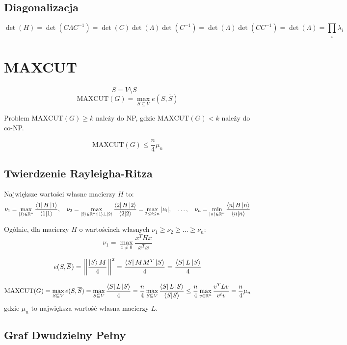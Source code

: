 \documentclass{../notatki}
\newcommand{\maxcut}{\textrm{MAXCUT}}
\begin{document}
\subsection{Diagonalizacja}

$$
\det(H) = \det(C \Lambda C^{-1}) = \det(C) \det(\Lambda) \det(C^{-1}) =
\det(\Lambda) \det(C C^{-1}) = \det(\Lambda) = \prod_i \lambda_i
$$

\section{MAXCUT}

$$
\overline{S} = V \setminus S \quad
$$
$$
\maxcut(G) = \max_{S \subseteq V} e(S, \overline{S})
$$

Problem $\maxcut(G) \geq k$ należy do NP, gdzie $\maxcut(G) < k$
należy do co-NP.

$$
\maxcut(G) \leq \frac{n}{4} \mu_n
$$

\subsection{Twierdzenie Rayleigha-Ritza}

Największe wartości własne macierzy $H$ to:
$$
\nu_1 = \max_{\ket{1} \in \mathbb{R}^n}
\frac{\bra{1}H\ket{1}}{\braket{1}{1}}, \quad \nu_2 = \max_{\ket{2} \in
\mathbb{R}^n : \ket{1} \perp \ket{2}}
\frac{\bra{2}H\ket{2}}{\braket{2}{2}} = \max_{2 \leq i \leq n}
|\nu_i|, \quad \dots, \quad \nu_n = \min_{\ket{n} \in \mathbb{R}^n}
\frac{\bra{n}H\ket{n}}{\braket{n}{n}}
$$

Ogólnie, dla macierzy $H$ o wartościach własnych $\nu_1 \geq \nu_2
\geq \dots \geq \nu_n$:
$$
\nu_1 = \max_{x \neq 0} \frac{x^THx}{x^Tx}
$$

\begin{examplebox}
  $$
  e(S, \overline{S}) = \left|\left|\frac{\ket{S} M}{4}\right|\right|^2 =
  \frac{\bra{S}MM^T\ket{S}}{4} =
  \frac{\bra{S}L\ket{S}}{4}
  $$

  $$
  \maxcut(G) = \max_{S \subseteq V} e(S, \overline{S}) = \max_{S
  \subseteq V} \frac{\bra{S}L\ket{S}}{4} = \frac{n}{4} \max_{S
  \subseteq V} \frac{\bra{S}L\ket{S}}{\braket{S}{S}} \leq \frac{n}{4}
  \max_{v \in \mathbb{R}^n} \frac{v^TLv}{v^tv} = \frac{n}{4} \mu_n
  $$
  gdzie $\mu_n$ to największa wartość własna macierzy $L$.
\end{examplebox}

\subsection{Graf Dwudzielny Pełny}
\end{document}
